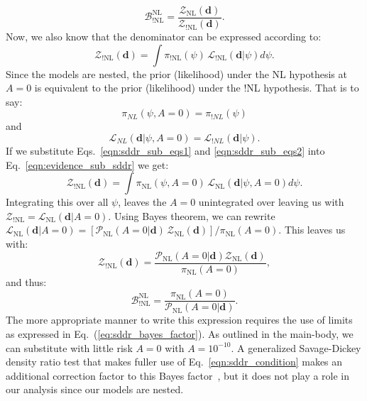 \begin{equation}
    \mathcal{B}^{\mathrm{NL}}_{!\mathrm{NL}} = \frac{\mathcal{Z}_{\mathrm{NL}}(\mathbf{d})}{\mathcal{Z}_{\mathrm{!NL}}(\mathbf{d})}.
\end{equation}
Now, we also know that the denominator can be expressed according to:
\begin{equation}\label{eqn:evidence_sub_sddr}
    \mathcal{Z}_{\mathrm{!NL}}(\mathbf{d}) = \int \pi_{\mathrm{!NL}}\left(\psi\right) \, \mathcal{L}_{\mathrm{!NL}} \left(\mathbf{d} | \psi \right)  d\psi.
\end{equation}
Since the models are nested, the prior (likelihood) under the NL hypothesis at $A=0$ is equivalent to the prior (likelihood) under the !NL hypothesis. That is to say:
\begin{equation}\label{eqn:sddr_sub_eqs1}
\pi_{NL}\left(\psi, A=0\right) = \pi_{!NL}\left(\psi \right) \end{equation}
and
\begin{equation}
\label{eqn:sddr_sub_eqs2}
\mathcal{L}_{NL}\left(\mathbf{d}|\psi, A=0\right) = \mathcal{L}_{!NL}\left( \mathbf{d} | \psi \right).
\end{equation}
If we substitute Eqs.~\ref{eqn:sddr_sub_eqs1} and \ref{eqn:sddr_sub_eqs2} into Eq.~\ref{eqn:evidence_sub_sddr} we get:
\begin{equation}
    \mathcal{Z}_{\mathrm{!NL}}(\mathbf{d}) = \int \pi_{\mathrm{NL}}\left(\psi, A=0\right) \, \mathcal{L}_{\mathrm{NL}} \left(\mathbf{d} | \psi, A=0 \right)  d\psi.
\end{equation}
Integrating this over all $\psi$, leaves the $A=0$ unintegrated over leaving us with $\mathcal{Z}_{\mathrm{!NL}} = \mathcal{L}_{\mathrm{NL}} \left(\mathbf{d} | A=0 \right)$. Using Bayes theorem, we can rewrite $\mathcal{L}_{\mathrm{NL}} \left(\mathbf{d} | A=0 \right) = [\mathcal{P}_{\mathrm{NL}}(A=0 | \mathbf{d}) \, \mathcal{Z}_{\mathrm{NL}}(\mathbf{d})] / \pi_{\mathrm{NL}} (A=0)$. This leaves us with:
\begin{equation}
    \mathcal{Z}_{\mathrm{!NL}}\left(\mathbf{d}\right) = \frac{\mathcal{P}_{\mathrm{NL}}\left(A=0 | \mathbf{d}\right) \mathcal{Z}_{\mathrm{NL}} \left(\mathbf{d} \right)} {\pi_{\mathrm{NL}} \left(A=0\right)},
\end{equation}
and thus:
\begin{equation}
    \mathcal{B}^{\mathrm{NL}}_{\mathrm{!NL}} = \frac{\pi_{\mathrm{NL}}\left(A=0\right)}{\mathcal{P}_{\mathrm{NL}}\left(A=0 | \mathbf{d}\right)}.
\end{equation}
The more appropriate manner to write this expression requires the use of limits as expressed in Eq.~(\ref{eq:sddr_bayes_factor}). As outlined in the main-body, we can substitute with little risk $A=0$ with $A=10^{-10}$. A generalized Savage-Dickey density ratio test that makes fuller use of Eq.~\ref{eqn:sddr_condition} makes an additional correction factor to this Bayes factor~\citep{verdinelli1995computing}, but it does not play a role in our analysis since our models are nested.

